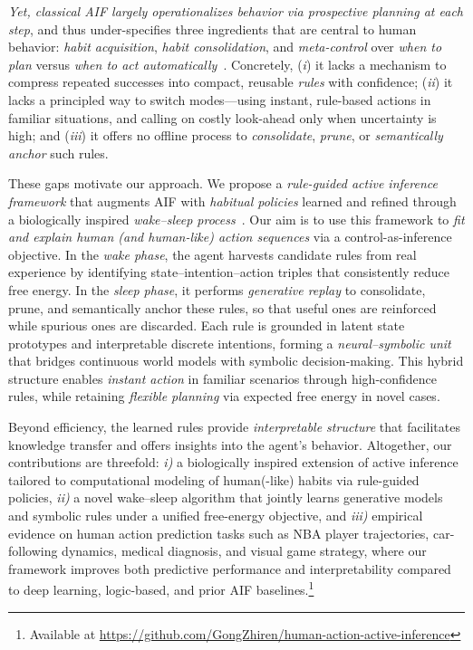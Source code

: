 \documentclass{article} %
\newcommand{\revise}[1]{#1}
\begin{document}
\emph{Yet, classical AIF largely operationalizes behavior via prospective planning at each step}, and thus under-specifies three ingredients that are central to human behavior: \emph{habit acquisition}, \emph{habit consolidation}, and \emph{meta-control} over \emph{when to plan} versus \emph{when to act automatically}~\citep{han2024synergizing, dung2024r}. Concretely, ({\it i}) it lacks a mechanism to compress repeated successes into compact, reusable \emph{rules} with confidence; ({\it ii}) it lacks a principled way to switch modes—using instant, rule-based actions in familiar situations, and calling on costly look-ahead only when uncertainty is high; and ({\it iii}) it offers no offline process to \emph{consolidate}, \emph{prune}, or \emph{semantically anchor} such rules. 

These gaps motivate our approach. We propose a \emph{rule-guided active inference framework} that augments AIF with \emph{habitual policies} learned and refined through a biologically inspired \emph{wake--sleep process}~\citep{hinton1995wake, hewitt2020learning,  ellis2023dreamcoder}. \revise{Our aim is to use this framework to \emph{fit and explain human (and human-like) action sequences} via a control-as-inference objective.} In the \emph{wake phase}, the agent harvests candidate rules from real experience by identifying state--intention--action triples that consistently reduce free energy. In the \emph{sleep phase}, it performs \emph{generative replay} to consolidate, prune, and semantically anchor these rules, so that useful ones are reinforced while spurious ones are discarded. Each rule is grounded in latent state prototypes and interpretable discrete intentions, forming a \emph{neural--symbolic unit} that bridges continuous world models with symbolic decision-making. This hybrid structure enables \emph{instant action} in familiar scenarios through high-confidence rules, while retaining \emph{flexible planning} via expected free energy in novel cases. 

Beyond efficiency, the learned rules provide \emph{interpretable structure} that facilitates knowledge transfer and offers insights into the agent’s behavior. Altogether, our contributions are threefold: {\it i)} \revise{a biologically inspired extension of active inference tailored to computational modeling of human(-like) habits via rule-guided policies}, {\it ii)} a novel wake--sleep algorithm that jointly learns generative models and symbolic rules under a unified free-energy objective, and {\it iii)} empirical evidence on \revise {human action prediction} tasks such as NBA player trajectories, car-following dynamics, medical diagnosis, and visual game strategy, where our framework improves both predictive performance and interpretability compared to deep learning, logic-based, and prior AIF baselines.\footnote{Available at \url{https://github.com/GongZhiren/human-action-active-inference}}
\end{document}
